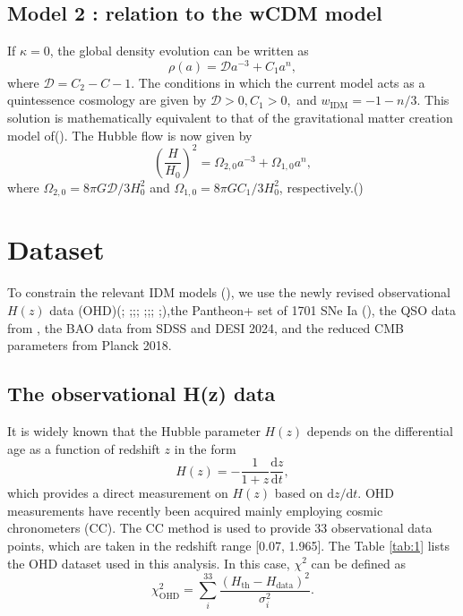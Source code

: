 \documentclass[twocolumn]{aastex631}
\begin{document}
\subsection{Model 2 : relation to the wCDM model}

   If $\kappa=0$, the global density evolution can be written as
   \begin{equation}
      \rho(a)=\mathcal{D}a^{-3}+C_1a^{n},
   \end{equation}
   where $\mathcal{D}=C_2-C-1$. The conditions in which the current 
   model acts as a quintessence cosmology are given by $\mathcal{D}>0,
   C_1>0,$ and $w_{\text{IDM}}=-1-n/3$. This solution is mathematically
   equivalent to that of the gravitational matter creation model of().
   The Hubble flow is now given by
   \begin{equation}
      \left(\frac{H}{H_0}\right)^2=\Omega_{2,0}a^{-3}+\Omega_{1,0}a^{n},
   \end{equation}
   where $\Omega_{2,0}=8\pi G\mathcal{D}/3H_0^2$ and 
   $\Omega_{1,0}=8\pi GC_1/3H_0^2$, respectively.(\cite{refId0})
   
\section{Dataset}

   To constrain the relevant IDM models (\cite{refId0}), we use the newly revised
   observational $H(z)$ data (OHD)(\cite{PhysRevD.71.123001};
   \cite{Daniel.Stern_2010};\cite{M.Moresco_2012};\cite{Zhang_2014};
   \cite{Moresco_2016};\cite{10.1093/mnras/stx301};\cite{10.1093/mnrasl/slv037};
   \cite{Borghi_2022};\cite{Jiao_2023}),the Pantheon+ set of 1701 SNe Ia 
   (\cite{Scolnic_2022}), the QSO data from \cite{Lusso_2020}, 
   the BAO data from SDSS and DESI 2024, and the reduced CMB parameters
   from Planck 2018.

\subsection{The observational H(z) data}

   It is widely known that the Hubble parameter $H(z)$ depends on
   the differential age as a function of redshift $z$ in the form
   \begin{equation}
      H(z)=-\frac{1}{1+z}\frac{\mathrm{d}z}{\mathrm{d}t},
   \end{equation}
   which provides a direct measurement on $H(z)$ based on
   $\mathrm{d}z/\mathrm{d}t$.
   OHD measurements have recently been acquired mainly employing
   cosmic chronometers (CC). The CC method is used to provide 33 observational
   data points, which are taken in the redshift range [0.07, 1.965].
   The Table \ref{tab:1} lists the OHD dataset used in this analysis.
   In this case, $\chi^2$ can be defined as
   \begin{equation}
      \chi_{\text{OHD}}^2=\sum_i^{33}\frac{(H_{\text{th}}-H_{\text{data}})^2}{\sigma_i^2}.
   \end{equation}
\end{document}
